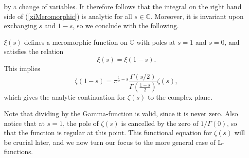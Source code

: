 by a change of variables. It therefore follows that the integral on the right hand side of (\ref{xiMeromorphic}) is analytic for all $s \in \mathbb{C}$. Moreover, it is invariant upon exchanging $s$ and $1 - s$, so we conclude with the following. 
\begin{theorem}
$\xi(s)$ defines a meromorphic function on $\mathbb{C}$ with poles at $s=1$ and $s=0$, and satisfies the relation
\begin{equation}
    \xi(s) = \xi(1-s). \nonumber
\end{equation}
This implies 
\begin{equation}
    \zeta(1-s) = \pi^{\frac{1}{2} - s}\frac{\Gamma(s/2)}{\Gamma\left(\frac{1-s}{2}\right)}\zeta(s), \nonumber
\end{equation}
which gives the analytic continuation for $\zeta(s)$ to the complex plane.
\end{theorem}
Note that dividing by the Gamma-function is valid, since it is never zero. Also notice that at $s=1$, the pole of $\zeta(s)$ is cancelled by the zero of $1/\Gamma(0)$, so that the function is regular at this point. This functional equation for $\zeta(s)$ will be crucial later, and we now turn our focus to the more general case of L-functions.
